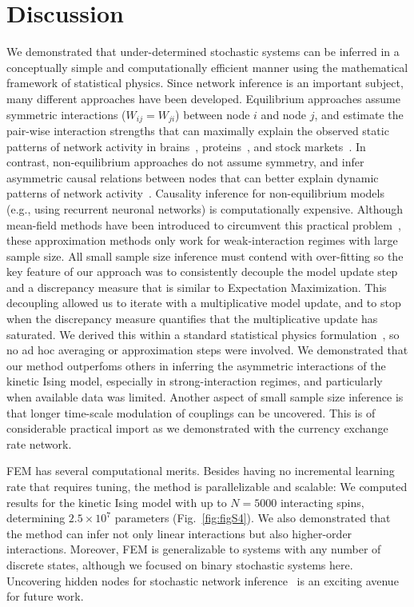 \documentclass[prx,twocolumn,twoside,showpacs,superscriptaddress]{revtex4-1}
\begin{document}
\section{Discussion}
We demonstrated that under-determined stochastic systems can be inferred in a conceptually simple and computationally efficient manner using the mathematical framework of statistical physics.
Since network inference is an important subject, many different approaches have been developed.
Equilibrium approaches assume symmetric interactions ($W_{ij}=W_{ji}$) between node $i$ and node $j$, and estimate the pair-wise interaction strengths that can maximally explain the observed static patterns of network activity in brains~\cite{Tkacik2014, Tkacik2015, Watanabe2013}, proteins~\cite{Mora2010, Weigt2009}, and stock markets~\cite{Bury2012}.
In contrast, non-equilibrium approaches do not assume symmetry, and infer asymmetric causal relations between nodes that can better explain  dynamic patterns of network activity~\cite{Zeng2013}.
Causality inference for non-equilibrium models (e.g., using recurrent neuronal networks) is computationally expensive.
Although mean-field methods have been introduced to circumvent this practical problem~\cite{Roudi2011}, these approximation methods only work for weak-interaction regimes with large sample size.
All small sample size inference must contend with over-fitting so the key feature of our approach was to consistently decouple the model update step and a discrepancy measure that is similar to Expectation Maximization. This decoupling allowed us to iterate with a multiplicative model update, and to stop when the discrepancy measure quantifies that the multiplicative update has saturated. 
We derived this within a standard statistical physics formulation~\cite{schwinger1953,toms2007schwinger},
so no ad hoc averaging or approximation steps were involved. We demonstrated that our method outperfoms others in inferring the asymmetric interactions of the kinetic Ising model, especially in strong-interaction regimes, and particularly when available data was limited. 
Another aspect of small sample size inference is that longer time-scale modulation of couplings can be uncovered. This is of considerable practical import as we demonstrated with the currency exchange rate network.

FEM has several computational merits. Besides having no incremental learning rate that requires tuning, %
the method is parallelizable and scalable:
We computed results for the kinetic Ising model with up to $N=5000$ interacting spins, determining $2.5 \times 10^7$ parameters (Fig.~\ref{fig:figS4}).
We also demonstrated that the method can infer not only linear interactions but also higher-order interactions.
Moreover, FEM is generalizable to systems with any number of discrete states, although we focused on binary stochastic systems here.
Uncovering hidden nodes for stochastic network inference~\cite{Hoang2018} is an exciting avenue for future work.
\end{document}
